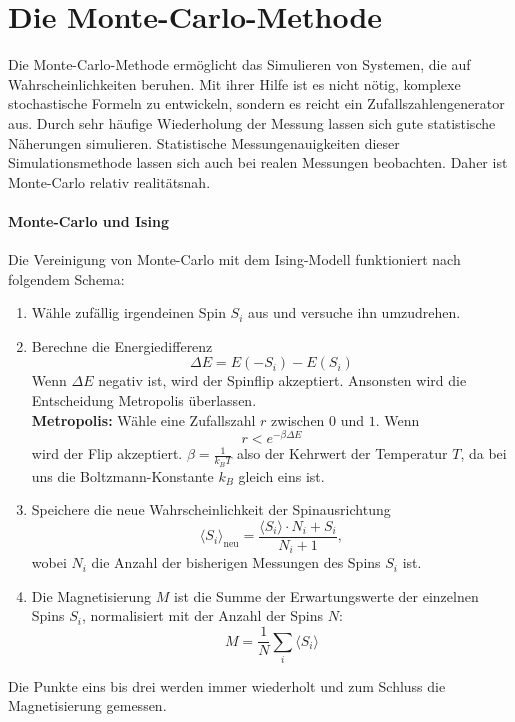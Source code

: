 \section{Die Monte-Carlo-Methode}
\label{sec:MonteCarloMethode}
Die Monte-Carlo-Methode ermöglicht das Simulieren von Systemen, die auf Wahrscheinlichkeiten beruhen.
Mit ihrer Hilfe ist es nicht nötig, komplexe stochastische Formeln zu entwickeln, sondern es reicht ein Zufallszahlengenerator aus.
Durch sehr häufige Wiederholung der Messung lassen sich gute statistische Näherungen simulieren.
Statistische Messungenauigkeiten dieser Simulationsmethode lassen sich auch bei realen Messungen beobachten. Daher ist Monte-Carlo relativ realitätsnah.

\paragraph{Monte-Carlo und Ising}
Die Vereinigung von Monte-Carlo mit dem Ising-Modell funktioniert nach folgendem Schema:
\begin{enumerate}
 \item Wähle zufällig irgendeinen Spin $S_i$ aus und versuche ihn umzudrehen.

 \item Berechne die Energiedifferenz
		\begin{equation}
		  \Delta E = E(-S_i) - E(S_i) \label{eq:EnergieDiff}
		\end{equation}
		Wenn $\Delta E$ negativ ist, wird der Spinflip akzeptiert.
		Ansonsten wird die Entscheidung Metropolis überlassen.\\
		\textbf{Metropolis:} Wähle eine Zufallszahl $r$ zwischen $0$ und $1$.
		Wenn
		\begin{equation}
		  r<e^{-\beta \Delta E} \label{eq:FlipChance}
		\end{equation}
		wird der Flip akzeptiert. $\beta=\frac{1}{k_B T}$ also der Kehrwert der Temperatur $T$, da bei uns die Boltzmann-Konstante $k_B$ gleich eins ist.

 \item Speichere die neue Wahrscheinlichkeit der Spinausrichtung
		\begin{equation}
		  \langle S_i \rangle_{\text{neu}} = \frac{\langle S_i \rangle \cdot N_i + S_i}{N_i + 1},  \label{eq:RekursiverMittelwert}
		\end{equation}
		wobei $N_i$ die Anzahl der bisherigen Messungen des Spins $S_i$ ist.

 \item Die Magnetisierung $M$ ist die Summe der Erwartungswerte der einzelnen Spins $S_i$, normalisiert mit der Anzahl der Spins $N$:
		\begin{equation}
		  M = \frac 1N \sum_i \langle S_i \rangle \label{eq:MagErwartungswert}
		\end{equation}
\end{enumerate}
Die Punkte eins bis drei werden immer wiederholt und zum Schluss die Magnetisierung gemessen.
